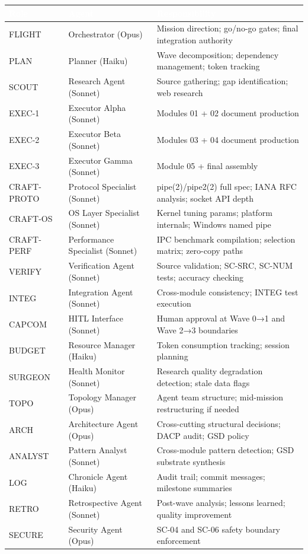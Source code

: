 \documentclass[11pt,letterpaper]{article}
\newcommand{\tableheader}[1]{\textbf{\sffamily\textcolor{white}{#1}}}
\begin{document}
\begin{center}
\begin{tabularx}{\textwidth}{L{2cm}L{3cm}X}
\toprule
{}
\tableheader{Role} & \tableheader{Agent} & \tableheader{Responsibility} \\
\midrule
FLIGHT & Orchestrator (Opus) & Mission direction; go/no-go gates; final integration authority \\
PLAN & Planner (Haiku) & Wave decomposition; dependency management; token tracking \\
SCOUT & Research Agent (Sonnet) & Source gathering; gap identification; web research \\
EXEC-1 & Executor Alpha (Sonnet) & Modules 01 + 02 document production \\
EXEC-2 & Executor Beta (Sonnet) & Modules 03 + 04 document production \\
EXEC-3 & Executor Gamma (Sonnet) & Module 05 + final assembly \\
CRAFT-PROTO & Protocol Specialist (Sonnet) & pipe(2)/pipe2(2) full spec; IANA RFC analysis; socket API depth \\
CRAFT-OS & OS Layer Specialist (Sonnet) & Kernel tuning params; platform internals; Windows named pipe \\
CRAFT-PERF & Performance Specialist (Sonnet) & IPC benchmark compilation; selection matrix; zero-copy paths \\
VERIFY & Verification Agent (Sonnet) & Source validation; SC-SRC, SC-NUM tests; accuracy checking \\
INTEG & Integration Agent (Sonnet) & Cross-module consistency; INTEG test execution \\
CAPCOM & HITL Interface (Sonnet) & Human approval at Wave 0→1 and Wave 2→3 boundaries \\
BUDGET & Resource Manager (Haiku) & Token consumption tracking; session planning \\
SURGEON & Health Monitor (Sonnet) & Research quality degradation detection; stale data flags \\
TOPO & Topology Manager (Opus) & Agent team structure; mid-mission restructuring if needed \\
ARCH & Architecture Agent (Opus) & Cross-cutting structural decisions; DACP audit; GSD policy \\
ANALYST & Pattern Analyst (Sonnet) & Cross-module pattern detection; GSD substrate synthesis \\
LOG & Chronicle Agent (Haiku) & Audit trail; commit messages; milestone summaries \\
RETRO & Retrospective Agent (Sonnet) & Post-wave analysis; lessons learned; quality improvement \\
SECURE & Security Agent (Opus) & SC-04 and SC-06 safety boundary enforcement \\
\bottomrule
\end{tabularx}
\end{center}
\end{document}
